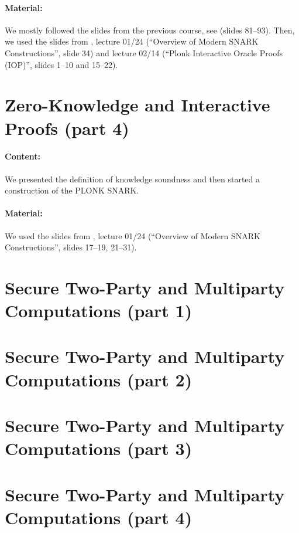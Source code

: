 \documentclass{llncs}
\begin{document}
\paragraph{Material:} We mostly followed the slides from the previous course, see \cite{ZK}  (slides 81--93). Then, we used the slides from \cite{ZKlearning}, lecture 01/24 (``Overview of Modern SNARK Constructions'', slide 34) and lecture 02/14 (``Plonk Interactive Oracle Proofs (IOP)'', slides 1--10 and 15--22).




\section{Zero-Knowledge and Interactive Proofs (part 4)}

\paragraph{Content:} 
We presented the definition of knowledge soundness and then started a construction of the PLONK SNARK.




\paragraph{Material:} We used the slides from \cite{ZKlearning}, lecture 01/24 (``Overview of Modern SNARK Constructions'', slides 17--19, 21--31).



\section{Secure Two-Party and Multiparty Computations (part 1)}

\section{Secure Two-Party and Multiparty Computations (part 2)}

\section{Secure Two-Party and Multiparty Computations (part 3)}

\section{Secure Two-Party and Multiparty Computations (part 4)}
\end{document}
